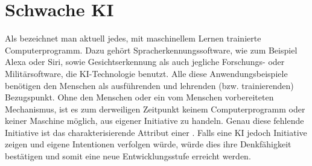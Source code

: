 \documentclass[12pt,german,ngerman]{report}
\begin{document}
    \section{Schwache KI}
        Als  bezeichnet man aktuell jedes,
        mit maschinellem Lernen trainierte Computerprogramm. 
        Dazu gehört Spracherkennungssoftware, wie zum Beispiel Alexa oder Siri,
        sowie Gesichtserkennung als auch jegliche Forschungs- oder Militärsoftware, die KI-Technologie benutzt.
        Alle diese Anwendungsbeispiele benötigen den Menschen als ausführenden und lehrenden (bzw. trainierenden)
        Bezugspunkt.
        Ohne den Menschen oder ein vom Menschen vorbereiteten Mechanismus, ist es zum derweiligen Zeitpunkt
        keinem Computerprogramm oder keiner Maschine möglich, aus eigener Initiative zu handeln.
        Genau diese fehlende Initiative ist das charakterisierende Attribut einer .
        Falls eine KI jedoch Initiative zeigen und eigene Intentionen verfolgen würde, würde dies 
        ihre Denkfähigkeit bestätigen und somit eine neue Entwicklungsstufe erreicht werden.
    \newpage
\end{document}
